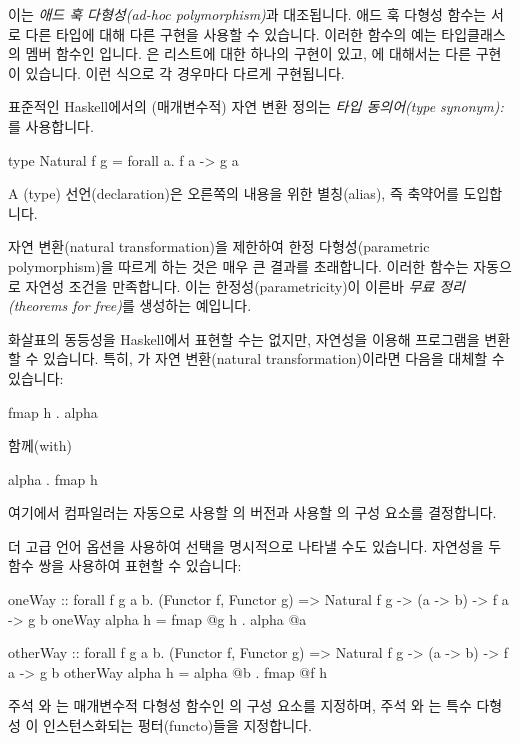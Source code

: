 \documentclass[DaoFP]{subfiles}
\begin{document}
이는 \emph{애드 훅 다형성(ad-hoc polymorphism)}과 대조됩니다. 애드 훅 다형성 함수는 서로 다른 타입에 대해 다른 구현을 사용할 수 있습니다. 이러한 함수의 예는  타입클래스의 멤버 함수인 입니다. 은 리스트에 대한 하나의 구현이 있고, 에 대해서는 다른 구현이 있습니다. 이런 식으로 각 경우마다 다르게 구현됩니다.

표준적인 Haskell에서의 (매개변수적) 자연 변환 정의는 \emph{타입 동의어(type synonym):}를 사용합니다.
\begin{haskell}
type Natural f g = forall a. f a -> g a
\end{haskell}
A (type) 선언(declaration)은 오른쪽의 내용을 위한 별칭(alias), 즉 축약어를 도입합니다.

자연 변환(natural transformation)을 제한하여 한정 다형성(parametric polymorphism)을 따르게 하는 것은 매우 큰 결과를 초래합니다. 이러한 함수는 자동으로 자연성 조건을 만족합니다. 이는 한정성(parametricity)이 이른바 \emph{무료 정리(theorems for free)}를 생성하는 예입니다.

화살표의 동등성을 Haskell에서 표현할 수는 없지만, 자연성을 이용해 프로그램을 변환할 수 있습니다. 특히, 가 자연 변환(natural transformation)이라면 다음을 대체할 수 있습니다:
\begin{haskell}
fmap h . alpha
\end{haskell}
함께(with)
\begin{haskell}
alpha . fmap h
\end{haskell}
여기에서 컴파일러는 자동으로 사용할 의 버전과 사용할 의 구성 요소를 결정합니다.

더 고급 언어 옵션을 사용하여 선택을 명시적으로 나타낼 수도 있습니다. 자연성을 두 함수 쌍을 사용하여 표현할 수 있습니다:
\begin{haskell}
oneWay :: 
  forall f g a b. (Functor f, Functor g) => 
  Natural f g -> (a -> b) -> f a -> g b
oneWay alpha h = fmap @g h . alpha @a
\end{haskell}
\begin{haskell}
otherWay :: 
  forall f g a b. (Functor f, Functor g) => 
  Natural f g -> (a -> b) -> f a -> g b
otherWay alpha h = alpha @b . fmap @f h
\end{haskell}
주석 와 는 매개변수적 다형성 함수인 의 구성 요소를 지정하며, 주석 와 는 특수 다형성 이 인스턴스화되는 펑터(functo)들을 지정합니다.
\end{document}

